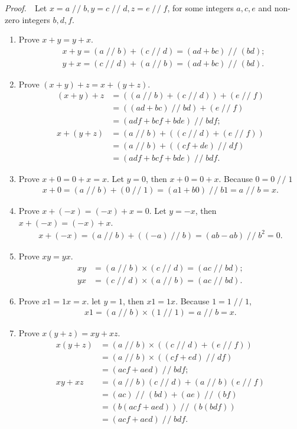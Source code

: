 \documentclass{book}
\DeclareMathOperator{\tby}{/\!/}%
\newcommand{\pff}{\vspace{.25em}\noindent\emph{Proof.}~~}
\begin{document}
\pff Let $x=a\tby b,y=c\tby d,z=e\tby f$, for some integers $a,c,e$ and non-zero integers $b,d,f$.
\begin{enumerate}
    \item Prove $x+y=y+x$.
    \begin{align*}
        &x+y=(a\tby b)+(c\tby d)=(ad+bc)\tby(bd);\\
        &y+x=(c\tby d)+(a\tby b)=(ad+bc)\tby(bd).
    \end{align*}

    \item Prove $(x+y)+z=x+(y+z)$.
    \begin{align*}
        (x+y)+z&=((a\tby b)+(c\tby d))+(e\tby f)\\
               &=((ad+bc)\tby bd)+(e\tby f)\\
               &=(adf+bcf+bde)\tby bdf;\\
        x+(y+z)&=(a\tby b)+((c\tby d)+(e\tby f))\\
               &=(a\tby b)+((cf+de)\tby df)\\
               &=(adf+bcf+bde)\tby bdf.
    \end{align*}

    \item Prove $x+0=0+x=x$. Let $y=0$, then $x+0=0+x$. Because $0=0\tby 1$
    \begin{align*}
        x+0=(a\tby b)+(0\tby 1)=(a1+b0)\tby b1=a\tby b=x.
    \end{align*}

    \item Prove $x+(-x)=(-x)+x=0$. Let $y=-x$, then $x+(-x)=(-x)+x$.
    \begin{align*}
      x+(-x)=(a\tby b)+((-a)\tby b)=(ab-ab)\tby b^2=0.
    \end{align*}

    \item Prove $xy=yx$.
    \begin{align*}
        xy&=(a\tby b)\times(c\tby d)=(ac\tby bd);\\
        yx&=(c\tby d)\times(a\tby b)=(ac\tby bd).
    \end{align*}

    \item Prove $x1=1x=x$. let $y=1$, then $x1=1x$. Because $1=1\tby1$,
    \begin{align*}
        x1=(a\tby b)\times(1\tby1)=a\tby b=x.
    \end{align*}

    \item Prove $x(y+z)=xy+xz$.
    \begin{align*}
        x(y+z)&=(a\tby b)\times((c\tby d)+(e\tby f))\\
              &=(a\tby b)\times((cf+ed)\tby df)\\
              &=(acf+aed)\tby bdf;\\
        xy+xz&=(a\tby b)(c\tby d)+(a\tby b)(e\tby f)\\
             &=(ac)\tby(bd)+(ae)\tby(bf)\\
             &=(b(acf+aed))\tby(b(bdf))\\
             &=(acf+aed)\tby bdf.
    \end{align*}


\end{enumerate}
\end{document}
